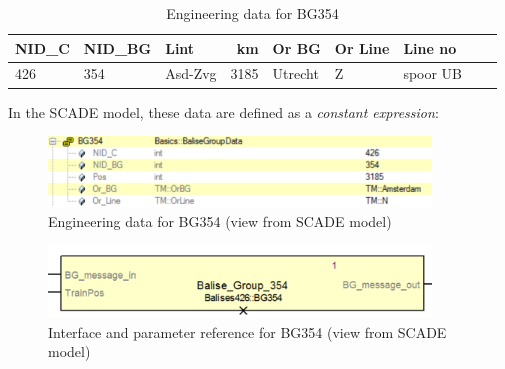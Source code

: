\documentclass{template/openetcs_article}
\begin{document}
\begin{table}[H]
  \centering
    \footnotesize\sffamily
\begin{tabular}{| l| l| l| r| l| l| l| l l}
\hline
\bf{NID\_C} & \bf{NID\_BG} & \bf{Lint} & \bf{km} & \bf{Or BG} & \bf{Or Line} & \bf{Line no} \\ 
\hline

426 & 354 & Asd-Zvg & 3185 & Utrecht & Z & spoor UB \\

\hline
\end{tabular}
\caption{Engineering data for BG354}
  \label{tab:bg354}
\end{table}

In the SCADE model, these data are defined as a \emph{constant expression}:
\begin{figure}[H]
  \centering
  \includegraphics[width=4in]{images/EngDataBG354SCADE}
  \caption{Engineering data for BG354 (view from SCADE model)}
  \label{fig:baliseposSCADE}
\end{figure}

\begin{figure}[H]
  \centering
  \includegraphics[width=4in]{images/BG354}
  \caption{Interface and parameter reference for BG354 (view from SCADE model)}
  \label{fig:BG354SCADE}
\end{figure}
\end{document}
